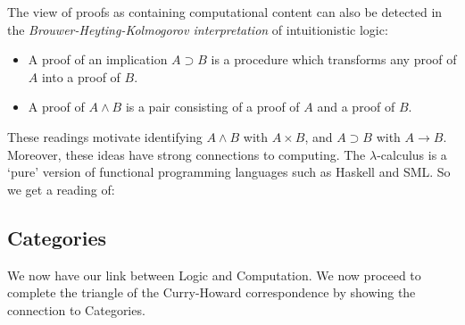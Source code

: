 \documentclass{svmult}
\begin{document}
%
The view of proofs as containing computational content can also be detected in the \emph{Brouwer-Heyting-Kolmogorov interpretation} of intuitionistic
logic:
\begin{itemize}
\item A proof of an implication $A \supset B$ is a procedure which transforms any proof of $A$ into a proof of $B$.
\item A proof of $A \wedge B$ is a pair consisting of a proof of $A$  and a proof of $B$.
\end{itemize}
These readings motivate identifying $A \wedge B$ with $A \times B$, and $A \supset B$ with $A \rightarrow B$.
%
Moreover, these ideas have strong connections to computing. The $\lambda$-calculus is a `pure' version of functional programming languages such as
Haskell and SML. So we get a reading of:
\begin{center}
\end{center}


\subsection{Categories}
We now have our link between Logic and Computation. We now proceed to complete the triangle of the Curry-Howard correspondence by showing the connection to Categories.
\end{document}
